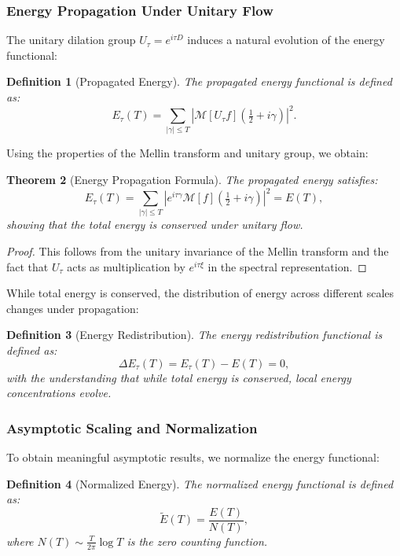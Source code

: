 \documentclass[11pt,hyp,]{nyjm}
\newtheorem{theorem}{Theorem}
\newtheorem{definition}[theorem]{Definition}
\begin{document}
\subsubsection{Energy Propagation Under Unitary Flow}

The unitary dilation group $U_\tau = e^{i\tau D}$ induces a natural evolution of the energy functional:

\begin{definition}[Propagated Energy]\label{def:propagated-energy}
The \emph{propagated energy functional} is defined as:
\[
E_\tau(T) = \sum_{|\gamma| \leq T} |\mathcal{M}[U_\tau f](\tfrac12 + i\gamma)|^2.
\]
\end{definition}

Using the properties of the Mellin transform and unitary group, we obtain:

\begin{theorem}[Energy Propagation Formula]\label{thm:energy-propagation}
The propagated energy satisfies:
\[
E_\tau(T) = \sum_{|\gamma| \leq T} |e^{i\tau\gamma} \mathcal{M}[f](\tfrac12 + i\gamma)|^2 = E(T),
\]
showing that the total energy is conserved under unitary flow.
\end{theorem}

\begin{proof}
This follows from the unitary invariance of the Mellin transform and the fact that $U_\tau$ acts as multiplication by $e^{i\tau\xi}$ in the spectral representation.
\end{proof}

While total energy is conserved, the distribution of energy across different scales changes under propagation:

\begin{definition}[Energy Redistribution]\label{def:energy-redist}
The \emph{energy redistribution functional} is defined as:
\[
\Delta E_\tau(T) = E_\tau(T) - E(T) = 0,
\]
with the understanding that while total energy is conserved, local energy concentrations evolve.
\end{definition}

\subsubsection{Asymptotic Scaling and Normalization}

To obtain meaningful asymptotic results, we normalize the energy functional:

\begin{definition}[Normalized Energy]\label{def:normalized-energy}
The \emph{normalized energy functional} is defined as:
\[
\widetilde{E}(T) = \frac{E(T)}{N(T)},
\]
where $N(T) \sim \frac{T}{2\pi} \log T$ is the zero counting function.
\end{definition}
\end{document}
